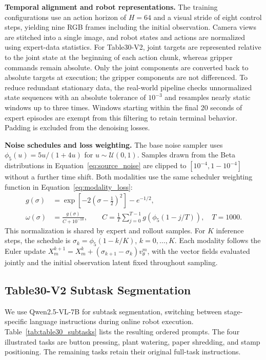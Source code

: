 \textbf{Temporal alignment and robot representations.}
The training configurations use an action horizon of $H=64$ and a visual stride of eight control steps, yielding nine RGB frames including the initial observation.
Camera views are stitched into a single image, and robot states and actions are normalized using expert-data statistics.
For Table30-V2, joint targets are represented relative to the joint state at the beginning of each action chunk, whereas gripper commands remain absolute.
Only the joint components are converted back to absolute targets at execution; the gripper components are not differenced.
To reduce redundant stationary data, the real-world pipeline checks unnormalized state sequences with an absolute tolerance of $10^{-3}$ and resamples nearly static windows up to three times.
Windows starting within the final 20 seconds of expert episodes are exempt from this filtering to retain terminal behavior.
Padding is excluded from the denoising losses.

\textbf{Noise schedules and loss weighting.}
The base noise sampler uses $\phi_5(u)=5u/(1+4u)$ for $u\sim\mathcal U(0,1)$.
Samples drawn from the Beta distributions in Equation~\ref{eq:source_noise} are clipped to $[10^{-4},1-10^{-4}]$ without a further time shift.
Both modalities use the same scheduler weighting function in Equation~\ref{eq:modality_loss}:
\begin{equation}
\begin{aligned}
    g(\sigma)&=\exp\!\left[-2(\sigma-\tfrac12)^2\right]-e^{-1/2},\\
    \omega(\sigma)&=\frac{g(\sigma)}{C+10^{-10}},
    \qquad C=\frac{1}{T}\sum_{j=0}^{T-1}g\!\left(\phi_5(1-j/T)\right),
    \quad T=1000.
\end{aligned}
\end{equation}
This normalization is shared by expert and rollout samples.
For $K$ inference steps, the schedule is $\sigma_k=\phi_5(1-k/K)$, $k=0,\ldots,K$.
Each modality follows the Euler update
$X_m^{k+1}=X_m^k+(\sigma_{k+1}-\sigma_k)v_\theta^m$,
with the vector fields evaluated jointly and the initial observation latent fixed throughout sampling.

\subsection{Table30-V2 Subtask Segmentation}
\label{app:table30_training}

We use Qwen2.5-VL-7B for subtask segmentation, switching between stage-specific language instructions during online robot execution.
Table~\ref{tab:table30_subtasks} lists the resulting ordered prompts.
The four illustrated tasks are button pressing, plant watering, paper shredding, and stamp positioning. The remaining tasks retain their original full-task instructions.

